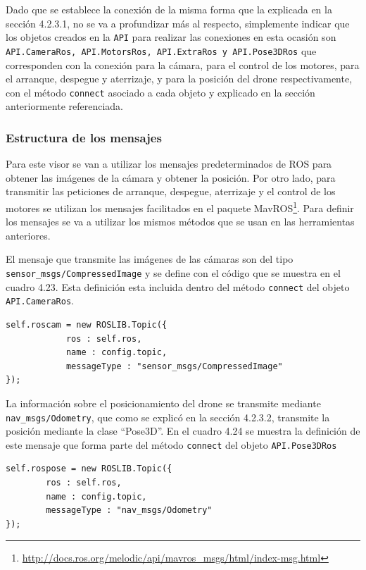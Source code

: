 Dado que se establece la conexión de la misma forma que la explicada en la sección 4.2.3.1, no se va a profundizar más al respecto, simplemente indicar que los objetos creados en la \texttt{API} para realizar las conexiones en esta ocasión son \texttt{API.CameraRos, API.MotorsRos, API.ExtraRos y API.Pose3DRos} que corresponden con la conexión para la cámara, para el control de los motores, para el arranque, despegue y aterrizaje, y para la posición del drone respectivamente, con el método \texttt{connect} asociado a cada objeto y explicado en la sección anteriormente referenciada.

\subsubsection{Estructura de los mensajes}

Para este visor se van a utilizar los mensajes predeterminados de ROS para obtener las imágenes de la cámara y obtener la posición. Por otro lado, para transmitir las peticiones de arranque, despegue, aterrizaje y el control de los motores se utilizan los mensajes facilitados en el paquete MavROS\footnote{\url{http://docs.ros.org/melodic/api/mavros_msgs/html/index-msg.html}}. Para definir los mensajes se va a utilizar los mismos métodos que se usan en las herramientas anteriores.

El mensaje que transmite las imágenes de las cámaras son del tipo \texttt{sensor\_msgs/CompressedImage} y se define con el código que se muestra en el cuadro 4.23. Esta definición esta incluida dentro del método \texttt{connect} del objeto \texttt{API.CameraRos}.

\begin{lstlisting}[caption= Definición del mensaje para la información de las cámaras, label=cod.mensajecamdrone]
self.roscam = new ROSLIB.Topic({
            ros : self.ros,
            name : config.topic,
            messageType : "sensor_msgs/CompressedImage"
});
\end{lstlisting}

La información sobre el posicionamiento del drone se transmite mediante \texttt{nav\_msgs/Odometry}, que como se explicó en la sección 4.2.3.2, transmite la posición mediante la clase ``Pose3D''. En el cuadro 4.24 se muestra la definición de este mensaje que forma parte del método \texttt{connect} del objeto \texttt{API.Pose3DRos}

\begin{lstlisting}[caption= Definición del mensaje para obtener el posicionamiento del drone, label=cod.mensajeposedrone]
self.rospose = new ROSLIB.Topic({
		ros : self.ros,
		name : config.topic,
		messageType : "nav_msgs/Odometry"
});
\end{lstlisting}

